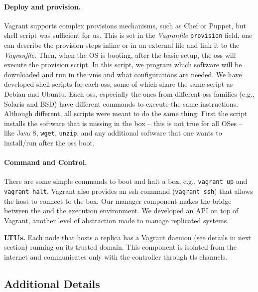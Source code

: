 \paragraph{Deploy and provision.}
Vagrant supports complex provisions mechanisms, such as Chef or Puppet, but shell script was sufficient for us. 
This is set in the \emph{Vagranfile} \texttt{provision} field, one can describe the provision steps inline or in an external file and link it to the \emph{Vagranfile}.
Then, when the OS is booting, after the basic setup, the \glspl{os} will execute the provision script.
In this script, we program which software will be downloaded and run in the \glspl{vm} and what configurations are needed. 
We have developed shell scripts for each \glspl{os}, some of which share the same script as Debian and Ubuntu. 
Each \glspl{os}, especially the ones from different \glspl{os} families (e.g., Solaris and BSD) have different commands to execute the same instructions.
Although different, all scripts were meant to do the same thing:
First the script installs the software that is missing in the box -- this is not true for all OSes -- like Java 8, \texttt{wget}, \texttt{unzip}, and any additional software that one wants to install/run after the \glspl{os} boot.



\paragraph{Command and Control.}
There are some simple commands to boot and halt a box, e.g., \texttt{vagrant up} and \texttt{vagrant halt}. 
Vagrant also provides an ssh command (\texttt{vagrant ssh}) that allows the host to connect to the box. 
Our manager component makes the bridge between the \risk and the execution environment.
We developed an API on top of Vagrant, another level of abstraction made to manage replicated systems.


 \textbf{LTUs.} Each node that hosts a replica has a Vagrant daemon (see details in next section) running on its trusted domain.
This component is isolated from the internet and communicates only with the \system controller through \gls{tls} channels.

\subsection{Additional Details}
\label{sec:details}

